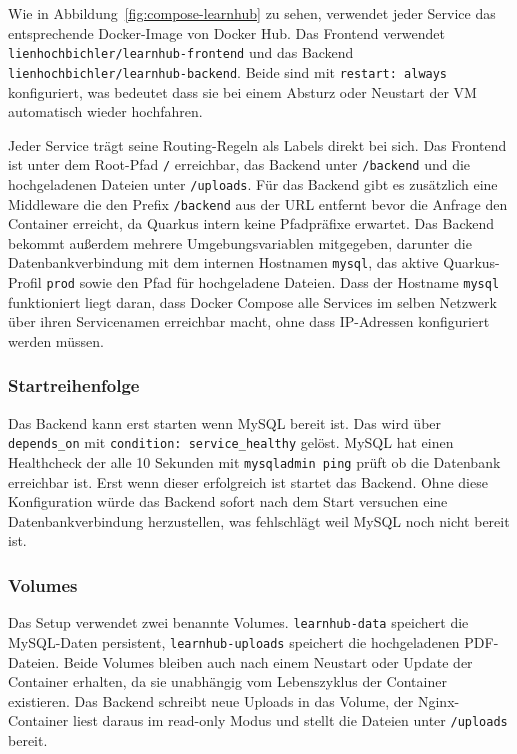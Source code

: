 Wie in Abbildung~\ref{fig:compose-learnhub} zu sehen, verwendet 
jeder Service das entsprechende Docker-Image von Docker Hub. Das 
Frontend verwendet \texttt{lienhochbichler/learnhub-frontend} und 
das Backend \texttt{lienhochbichler/learnhub-backend}. Beide sind 
mit \texttt{restart: always} konfiguriert, was bedeutet dass sie 
bei einem Absturz oder Neustart der VM automatisch wieder 
hochfahren.

Jeder Service trägt seine Routing-Regeln als Labels direkt bei 
sich. Das Frontend ist unter dem Root-Pfad \texttt{/} erreichbar, 
das Backend unter \texttt{/backend} und die hochgeladenen Dateien 
unter \texttt{/uploads}. Für das Backend gibt es zusätzlich eine 
Middleware die den Prefix \texttt{/backend} aus der URL entfernt 
bevor die Anfrage den Container erreicht, da Quarkus intern keine 
Pfadpräfixe erwartet. Das Backend bekommt außerdem mehrere 
Umgebungsvariablen mitgegeben, darunter die Datenbankverbindung 
mit dem internen Hostnamen \texttt{mysql}, das aktive Quarkus-Profil 
\texttt{prod} sowie den Pfad für hochgeladene Dateien. Dass der 
Hostname \texttt{mysql} funktioniert liegt daran, dass Docker 
Compose alle Services im selben Netzwerk über ihren Servicenamen 
erreichbar macht, ohne dass IP-Adressen konfiguriert werden müssen.

\subsubsection{Startreihenfolge}

Das Backend kann erst starten wenn MySQL bereit ist. Das wird 
über \texttt{depends\_on} mit \texttt{condition: service\_healthy} 
gelöst. MySQL hat einen Healthcheck der alle 10 Sekunden mit 
\texttt{mysqladmin ping} prüft ob die Datenbank erreichbar ist. 
Erst wenn dieser erfolgreich ist startet das Backend. Ohne diese 
Konfiguration würde das Backend sofort nach dem Start versuchen 
eine Datenbankverbindung herzustellen, was fehlschlägt weil MySQL 
noch nicht bereit ist.

\subsubsection{Volumes}

Das Setup verwendet zwei benannte Volumes. \texttt{learnhub-data} 
speichert die MySQL-Daten persistent, \texttt{learnhub-uploads} 
speichert die hochgeladenen PDF-Dateien. Beide Volumes bleiben 
auch nach einem Neustart oder Update der Container erhalten, da 
sie unabhängig vom Lebenszyklus der Container existieren. Das 
Backend schreibt neue Uploads in das Volume, der Nginx-Container 
liest daraus im read-only Modus und stellt die Dateien unter 
\texttt{/uploads} bereit.